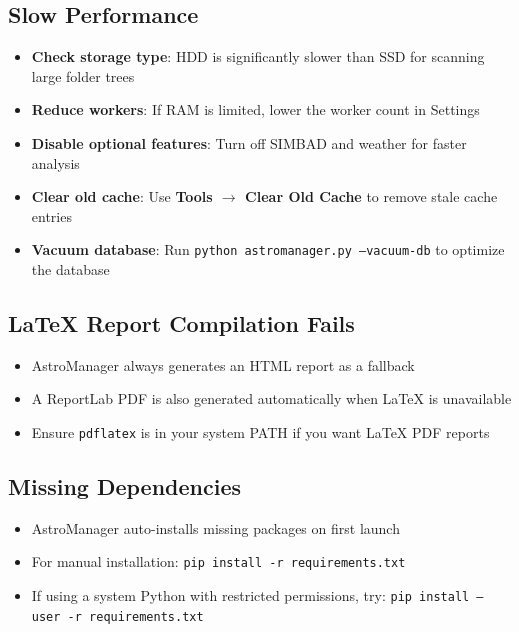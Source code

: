 \documentclass[11pt,a4paper]{article}
\begin{document}
\subsection{Slow Performance}

\begin{itemize}
    \item \textbf{Check storage type}: HDD is significantly slower than SSD for scanning large folder trees
    \item \textbf{Reduce workers}: If RAM is limited, lower the worker count in Settings
    \item \textbf{Disable optional features}: Turn off SIMBAD and weather for faster analysis
    \item \textbf{Clear old cache}: Use \textbf{Tools $\rightarrow$ Clear Old Cache} to remove stale cache entries
    \item \textbf{Vacuum database}: Run \texttt{python astromanager.py --vacuum-db} to optimize the database
\end{itemize}

\subsection{LaTeX Report Compilation Fails}

\begin{itemize}
    \item AstroManager always generates an HTML report as a fallback
    \item A ReportLab PDF is also generated automatically when LaTeX is unavailable
    \item Ensure \texttt{pdflatex} is in your system PATH if you want LaTeX PDF reports
\end{itemize}

\subsection{Missing Dependencies}

\begin{itemize}
    \item AstroManager auto-installs missing packages on first launch
    \item For manual installation: \texttt{pip install -r requirements.txt}
    \item If using a system Python with restricted permissions, try: \texttt{pip install --user -r requirements.txt}
\end{itemize}
\end{document}
